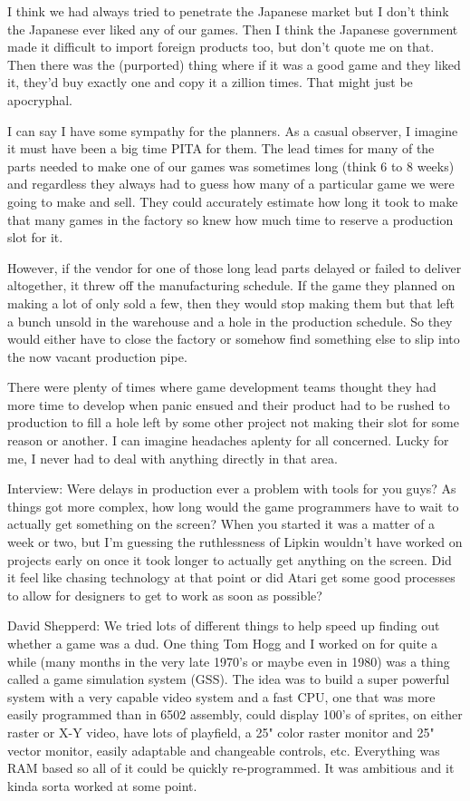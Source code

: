 I think we had always tried to penetrate the Japanese market but I don't think the Japanese ever liked any of our games. Then I think the Japanese government made it difficult to import foreign products too, but don't quote me on that. Then there was the (purported) thing where if it was a good game and they liked it, they'd buy exactly one and copy it a zillion times. That might just be apocryphal.

I can say I have some sympathy for the planners. As a casual observer, I imagine it must have been a big time PITA for them. The lead times for many of the parts needed to make one of our games was sometimes long (think 6 to 8 weeks) and regardless they always had to guess how many of a particular game we were going to make and sell. They could accurately estimate how long it took to make that many games in the factory so knew how much time to reserve a production slot for it. 

However, if the vendor for one of those long lead parts delayed or failed to deliver altogether, it threw off the manufacturing schedule. If the game they planned on making a lot of only sold a few, then they would stop making them but that left a bunch unsold in the warehouse and a hole in the production schedule. So they would either have to close the factory or somehow find something else to slip into the now vacant production pipe. 

There were plenty of times where game development teams thought they had more time to develop when panic ensued and their product had to be rushed to production to fill a hole left by some other project not making their slot for some reason or another. I can imagine headaches aplenty for all concerned. Lucky for me, I never had to deal with anything directly in that area.


Interview: Were delays in production ever a problem with tools for you guys? As things got more complex, how long would the game programmers have to wait to actually get something on the screen? When you started it was a matter of a week or two, but I'm guessing the ruthlessness of Lipkin wouldn't have worked on projects early on once it took longer to actually get anything on the screen. Did it feel like chasing technology at that point or did Atari get some good processes to allow for designers to get to work as soon as possible?

\textcolor{interviewee}{David Shepperd:} We tried lots of different things to help speed up finding out whether a game was a dud. One thing Tom Hogg and I worked on for quite a while (many months in the very late 1970's or maybe even in 1980) was a thing called a game simulation system (GSS). The idea was to build a super powerful system with a very capable video system and a fast CPU, one that was more easily programmed than in 6502 assembly, could display 100's of sprites, on either raster or X-Y video, have lots of playfield, a 25" color raster monitor and 25" vector monitor, easily adaptable and changeable controls, etc. Everything was RAM based so all of it could be quickly re-programmed. It was ambitious and it kinda sorta worked at some point. 

